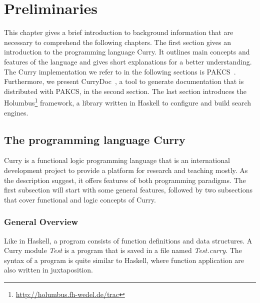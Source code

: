 \documentclass[%
	latex,%
	a4paper,%
	oneside,%
	chapterprefix,%
	headsepline,%
	12pt%
]{scrbook}
\begin{document}
\chapter{Preliminaries}\label{preliminaries}
This chapter gives a brief introduction to background information that
are necessary to comprehend the following chapters. %
The first section gives an introduction to the programming language
Curry. %
It outlines main concepts and features of the language and gives short
explanations for a better understanding. %
The Curry implementation we refer to in the following sections is
PAKCS~\cite{pakcs}. Furthermore, we present CurryDoc~\cite{currydoc2}, a
tool to generate documentation that is distributed with PAKCS, in the
second section. %
The last section introduces the Holumbus\footnote{\url{http://holumbus.fh-wedel.de/trac}} framework, a
library written in Haskell to configure and build search engines. %

\section{The programming language Curry}\label{preliminaries:curry}


Curry is a functional logic programming language that is an
international development project to provide a platform for research
and teaching mostly. %
As the description suggest, it offers features of both programming
paradigms. %
The first subsection will start with some general features, followed
by two subsections that cover functional and logic concepts of
Curry. %

\subsection{General Overview}
Like in Haskell, a program consists of function definitions and data
structures. %
A Curry module \emph{Test} is a program that is saved in a file named
\emph{Test.curry}. %
The syntax of a program is quite similar to Haskell, where function
application are also written in juxtaposition. %
\end{document}
